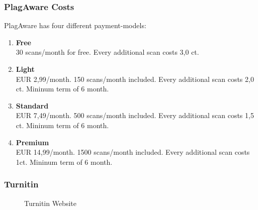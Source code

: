 \newpage
\subsubsection*{PlagAware Costs}
PlagAware has four different payment-models:
\begin{enumerate}
\item \textbf{Free}\\
30 scans/month for free. Every additional scan costs 3,0 ct. 
\item \textbf{Light}\\
EUR 2,99/month. 150 scans/month included. Every additional scan costs 2,0 ct. Mininum term of 6 month.
\item \textbf{Standard}\\
EUR 7,49/month. 500 scans/month included. Every additional scan costs 1,5 ct. Mininum term of 6 month.
\item \textbf{Premium}\\
EUR 14,99/month. 1500 scans/month included. Every additional scan costs 1ct. Mininum term of 6 month.
\end{enumerate}



\newpage
\subsubsection{Turnitin} 
 \begin{figure}[!h]
  \centering
  \caption{Turnitin Website}
  \label{fig:Turnitin Website}
\end{figure}

